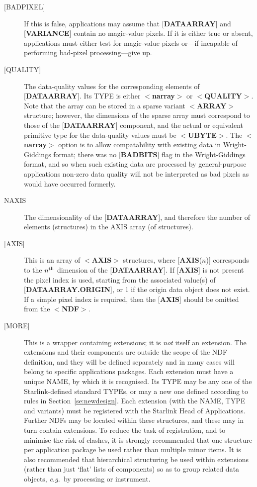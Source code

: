 \documentclass[twoside,11pt]{article}
\newcommand{\htmlref}[2]{#1}
\newcommand{\html}[1]{}
\newcommand{\latex}[1]{#1}
\renewcommand{\_}{\texttt{\symbol{95}}}
\begin{document}
\begin{description}
\item [{[}BAD\_PIXEL{]}]  If this
is false, applications may assume that
{[}{\bf DATA\_ARRAY}{]} and {[}{\bf VARIANCE}{]} contain no magic-value
pixels. If it is either true or absent, applications
must either test for magic-value pixels or---if incapable
of performing bad-pixel processing---give up.
\item [{[}QUALITY{]}]  The data-quality values for the
corresponding elements of {[}{\bf DATA\_ARRAY}{]}.
Its TYPE is either $<${\bf narray}$>$ or $<${\bf QUALITY}$>$.
Note that the array can be stored
in a sparse variant \mbox{$<${\bf ARRAY}$>$} structure;
however, the dimensions of the sparse array must correspond to those of the
{[}{\bf DATA\_ARRAY}{]} component, and the actual or equivalent
primitive type for the data-quality values must be $<${\bf \_UBYTE}$>$.
The $<${\bf narray}$>$ option is to allow compatability with existing data in
Wright-Giddings format; there was no
{[}{\bf BADBITS}{]} flag in the Wright-Giddings format,
and so when such existing data are processed by
general-purpose applications
non-zero data quality will not be interpreted as
bad pixels as would have occurred formerly.
\item [NAXIS]  The dimensionality of
the {[}{\bf DATA\_ARRAY}{]}, and therefore
the number of elements (structures) in the AXIS array
(of structures).
\item [{[}AXIS{]}] This is an array of $<${\bf AXIS}$>$ structures, where
{[}{\bf AXIS}($n$){]} corresponds to the $n^{\rm th}$ dimension of the
{[}{\bf DATA\_ARRAY}{]}.
If {[}{\bf AXIS}{]} is not present the pixel index is used, starting
from the associated value(s) of {[}{\bf DATA\_ARRAY.ORIGIN}{]}, or 1 if the
origin data object does not exist. If a simple pixel index is required,
then the {[}{\bf AXIS}{]} should be omitted from the $<${\bf NDF}$>$.
\item [{[}MORE{]}]  This is a wrapper containing extensions; it is {\em 
not} itself an extension. The extensions and their components
are outside the scope of the NDF definition, and they will
be defined separately and in many cases will belong
to specific applications packages.
Each extension must have a unique NAME, by which it is recognised.
Its TYPE may be any one of the Starlink-defined standard TYPEs, or
may a new one defined according to rules in 
\latex{Section~\ref{se:newdesign}.}\html{\htmlref{Creating New
Structures.}{se:newdesign}}
Each extension (with the NAME, TYPE and variants)
must be registered with the Starlink Head of Applications.
Further NDFs may be located within these structures, and these
may in turn contain extensions.  To reduce the task of registration,
and to minimise the risk of clashes, it is strongly recommended
that one structure per application package be used rather than multiple
minor items. It is also recommended that hierarchical structuring be used
within extensions (rather than just `flat' lists of components)
so as to group related data objects, {\it e.g.}\  by
processing or instrument.  
\end{description}
\end{document}
